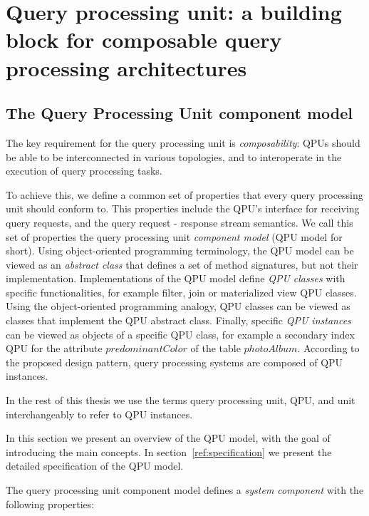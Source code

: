 \section{Query processing unit: a building block for composable query processing architectures}

\subsection{The Query Processing Unit component model}

The key requirement for the query processing unit is \textit{composability}:
QPUs should be able to be interconnected in various topologies,
and to interoperate in the execution of query processing tasks.

To achieve this, we define a common set of properties that every query processing unit should conform to.
This properties include the QPU's interface for receiving query requests, and the query request - response stream semantics.
We call this set of properties the query processing unit \textit{component model} (QPU model for short).
Using object-oriented programming terminology, the QPU model can be viewed as an \textit{abstract class}
that defines a set of method signatures, but not their implementation.
Implementations of the QPU model define \textit{QPU classes} with specific functionalities, for example
filter, join or materialized view QPU classes.
Using the object-oriented programming analogy, QPU classes can be viewed as classes that implement the QPU
abstract class.
Finally, specific \textit{QPU instances} can be viewed as objects of a specific QPU class, for example a secondary
index QPU for the attribute $predominantColor$ of the table $photoAlbum$.
According to the proposed design pattern, query processing systems are composed of QPU instances.

In the rest of this thesis we use the terms query processing unit, QPU, and unit interchangeably to refer to QPU instances.

\bigskip
\noindent
In this section we present an overview of the QPU model, with the goal of introducing the main concepts.
In section~\ref{ref:specification} we present the detailed specification of the QPU model.

The query processing unit component model defines a \textit{system component} with the following properties:

